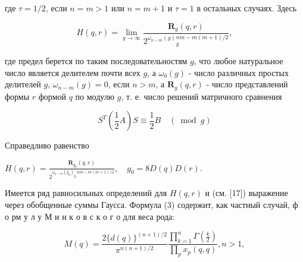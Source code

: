 \documentclass[10pt]{article}
\begin{document}
где $\tau=1 / 2$, если $n=m>1$ или $n=m+1$ и $\tau=1$ в остальных случаях. Здесь



\[

H(q, r)=\lim _{g \rightarrow \infty} \frac{\boldsymbol{R}_{g}(q, r)}{2^{\omega_{n-m}(g)}{ }_{g}^{n m-m(m+1) / 2}},

\]



где предел берется по таким последовательностям $g$, что любое натуральное число является делителем почти всех $g$, а $\omega_{0}(g)$ - число различных простых делителей $g$, $\omega_{n-m}(g)=0$, если $n>m$, а $\boldsymbol{R}_{g}(q, r)$ - число представлений формы $r$ формой $q$ по модулю $g$, т. е. число решений матричного сравнения



\[

S^{T}\left(\frac{1}{2} A\right) S \equiv \frac{1}{2} B \quad(\bmod g)

\]



Справедливо равенство



$H(q, r)=\frac{\boldsymbol{R}_{g_{0}}(q, r)}{2^{\omega_{n-m}\left(g_{0}\right)_{g_{0}} n m-m(m+1) / 2}}, \quad g_{0}=8 D(q) D(r)$.



Имеется ряд равносильных определений для $H(q, r)$ и (см. [17]) выражение через обобщенные суммы Гаусса. Формула (3) содержит, как частный случай, ф о рм у л у М и н к о в с к о г о для веса рода:



\[

M(q)=\frac{2\{d(q)\}^{(n+1) / 2}}{\pi^{n(n+1) / 2}} \frac{\prod_{k=1}^{n} \Gamma\left(\frac{k}{2}\right)}{\prod_{p} x_{p}(q, q)}, n>1,

\]
\end{document}
